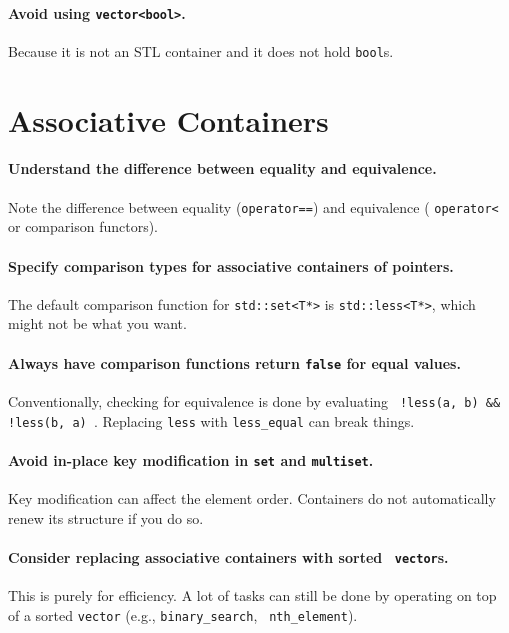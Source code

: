 \documentclass{article}
\begin{document}
\paragraph{Avoid using {\tt vector<bool>}.} Because it is not an STL container
and it does not hold {\tt bool}s.

\section{Associative Containers}

\paragraph{Understand the difference between equality and equivalence.} Note
the difference between equality ({\tt operator==}) and equivalence (
{\tt operator<} or comparison functors).

\paragraph{Specify comparison types for associative containers of pointers.}
The default comparison function for {\tt std::set<T*>} is {\tt std::less<T*>},
which might not be what you want.  

\paragraph{Always have comparison functions return {\tt false} for equal
values.} Conventionally, checking for equivalence is done by evaluating {\tt
!less(a, b) \&\& !less(b, a) }.  Replacing {\tt less} with {\tt less\_equal} can
break things.

\paragraph{Avoid in-place key modification in {\tt set} and {\tt multiset}.}
Key modification can affect the element order.  Containers do not automatically
renew its structure if you do so.

\paragraph{Consider replacing associative containers with sorted {\tt
vector}s.} This is purely for efficiency.  A lot of tasks can still be done by
operating on top of a sorted {\tt vector} (e.g., {\tt binary\_search}, {\tt
nth\_element}).
\end{document}
